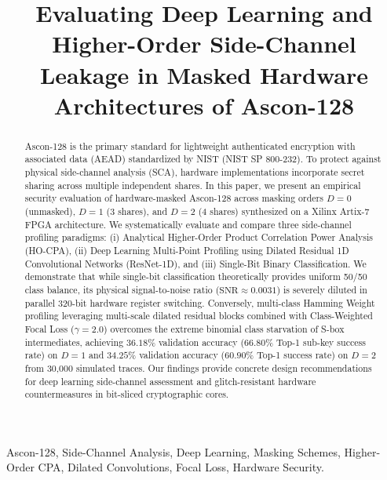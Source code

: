 \documentclass[journal,10pt,twocolumn]{IEEEtran}
\begin{document}
\title{Evaluating Deep Learning and Higher-Order Side-Channel Leakage in Masked Hardware Architectures of Ascon-128}

\author{
}

\maketitle

\begin{abstract}
Ascon-128 is the primary standard for lightweight authenticated encryption with associated data (AEAD) standardized by NIST (NIST SP 800-232). To protect against physical side-channel analysis (SCA), hardware implementations incorporate secret sharing across multiple independent shares. In this paper, we present an empirical security evaluation of hardware-masked Ascon-128 across masking orders $D=0$ (unmasked), $D=1$ (3 shares), and $D=2$ (4 shares) synthesized on a Xilinx Artix-7 FPGA architecture. We systematically evaluate and compare three side-channel profiling paradigms: (i) Analytical Higher-Order Product Correlation Power Analysis (HO-CPA), (ii) Deep Learning Multi-Point Profiling using Dilated Residual 1D Convolutional Networks (ResNet-1D), and (iii) Single-Bit Binary Classification. We demonstrate that while single-bit classification theoretically provides uniform 50/50 class balance, its physical signal-to-noise ratio ($\text{SNR} \approx 0.0031$) is severely diluted in parallel 320-bit hardware register switching. Conversely, multi-class Hamming Weight profiling leveraging multi-scale dilated residual blocks combined with Class-Weighted Focal Loss ($\gamma = 2.0$) overcomes the extreme binomial class starvation of S-box intermediates, achieving $36.18\%$ validation accuracy ($66.80\%$ Top-1 sub-key success rate) on $D=1$ and $34.25\%$ validation accuracy ($60.90\%$ Top-1 success rate) on $D=2$ from 30,000 simulated traces. Our findings provide concrete design recommendations for deep learning side-channel assessment and glitch-resistant hardware countermeasures in bit-sliced cryptographic cores.
\end{abstract}

\begin{IEEEkeywords}
Ascon-128, Side-Channel Analysis, Deep Learning, Masking Schemes, Higher-Order CPA, Dilated Convolutions, Focal Loss, Hardware Security.
\end{IEEEkeywords}
\end{document}
